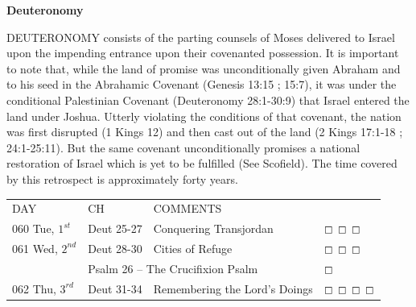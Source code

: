 \documentclass[10pt,landscape,twocolumn,letterpaper]{article}
\begin{document}

\begin{center}
\textbf{Deuteronomy}
\end{center}
DEUTERONOMY consists of the parting counsels of Moses delivered to Israel upon the impending entrance upon their covenanted possession. It is important to note that, while the land of promise was unconditionally given Abraham and to his seed in the Abrahamic Covenant (Genesis 13:15 ; 15:7), it was under the conditional Palestinian Covenant (Deuteronomy 28:1-30:9) that Israel entered the land under Joshua. Utterly violating the conditions of that covenant, the nation was first disrupted (1 Kings 12) and then cast out of the land (2 Kings 17:1-18 ; 24:1-25:11). But the same covenant unconditionally promises a national restoration of Israel which is yet to be fulfilled (See Scofield).  The time covered by this retrospect is approximately forty years.
 
\begin{tabular}{p{0.7in}p{0.7in}p{1.8in}p{0.55in}}
  DAY & CH & COMMENTS &  \\

\tiny 060 \normalsize \textcolor[rgb]{0.00,0.00,1.00}{Tue, $1^{st}$} & \textcolor[rgb]{0.00,0.00,1.00}{Deut 25-27} & \textcolor[rgb]{0.50,0.50,0.50}{\small Conquering Transjordan} & $\boxempty$ $\boxempty$ $\boxempty$\\


\tiny 061 \normalsize \textcolor[rgb]{0.00,0.00,1.00}{Wed, $2^{nd}$} & \textcolor[rgb]{0.00,0.00,1.00}{Deut 28-30} & \textcolor[rgb]{0.50,0.50,0.50}{\small Cities of Refuge} & $\boxempty$ $\boxempty$ $\boxempty$\\
     & \multicolumn{2}{l}{\textcolor[rgb]{1.00,0.00,0.00}{Psalm 26 -- The Crucifixion Psalm}} & $\boxempty$ \\

\tiny 062 \normalsize \textcolor[rgb]{0.00,0.00,1.00}{Thu, $3^{rd}$} & \textcolor[rgb]{0.00,0.00,1.00}{Deut 31-34} & \textcolor[rgb]{0.50,0.50,0.50}{\small Remembering the Lord's Doings} & $\boxempty $ $\boxempty$ $\boxempty$ $\boxempty$\\

\end{tabular}
\end{document}
